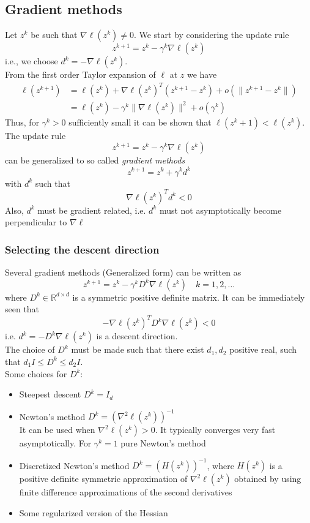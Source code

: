 \documentclass[openany]{book}
\newcommand{\R}{\mathbb{R}}                %
\theoremstyle{definition}
\theoremstyle{remark}
\begin{document}
\subsection{Gradient methods}
Let $z^k$ be such that $\nabla\ell(z^k)\neq 0$. We start by considering the update rule 
\[
    z^{k+1} = z^k-\gamma^k\nabla\ell(z^k)
\]
i.e., we choose $d^k = -\nabla\ell(z^k)$.\\
From the first order Taylor expansion of $\ell$ at $z$ we have 
\begin{align*}
    \ell(z^{k+1}) & =  \ell(z^k)+\nabla\ell(z^k)^T(z^{k+1}-z^k)+o(\|z^{k+1}-z^k\|)\\
    & =  \ell(z^k)-\gamma^k\|\nabla\ell(z^k)\|^2+o(\gamma^k)
\end{align*}
Thus, for $\gamma^k>0$ sufficiently small it can be shown that $\ell(z^k+1)<\ell(z^k)$.\\
The update rule 
\[
    z^{k+1}=z^k-\gamma^k\nabla\ell(z^k)
\]
can be generalized to so called \emph{gradient methods}
\[
    z^{k+1}=z^k+\gamma^kd^k
\]
with $d^k$ such that
\[
    \nabla\ell(z^k)^Td^k<0
\]
Also, $d^k$ must be gradient related, i.e. $d^k$ must not asymptotically become perpendicular to $\nabla\ell$

\subsubsection{Selecting the descent direction}

Several gradient methods (Generalized form) can be written as 
\[
    z^{k+1} = z^k-\gamma^kD^k\nabla\ell(z^k) \quad k=1,2,\dots
\]
where $D^k\in\R^{d\times d}$ is  a symmetric positive definite matrix. It can be immediately seen that 
\[
    -\nabla\ell(z^k)^TD^k\nabla\ell(z^k)<0
\]
i.e. $d^k = -D^k\nabla\ell(z^k)$ is a descent direction.\\
The choice of $D^k$ must be made such that there exist $d_1,d_2$ positive real, such that $d_1 I \leq D^k \leq d_2 I$.\\ [0.5cm]
Some choices for $D^k$:
\begin{itemize}
    \item Steepest descent $D^k=I_d$
    \item Newton's method $D^k = (\nabla^2\ell(z^k))^{-1}$\\
        It can be used when $\nabla^2\ell(z^k)>0$. It typically converges very fast asymptotically. For $\gamma^k = 1$ pure Newton's method
    \item Discretized Newton's method $D^k=(H(z^k))^{-1}$, where $H(z^k)$ is a positive definite symmetric approximation of $\nabla^2\ell(z^k)$ obtained by using finite difference approximations of the second derivatives 
    \item Some regularized version of the Hessian
\end{itemize}
\end{document}
